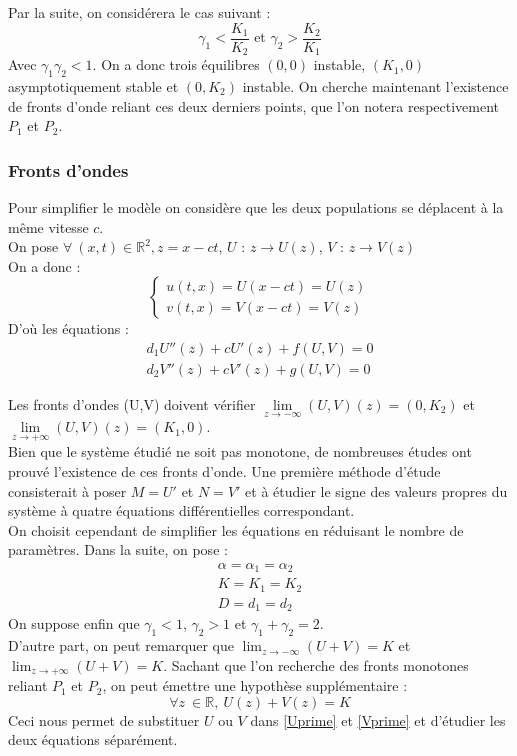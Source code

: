 \documentclass[a4paper,11pt]{article}
\begin{document}
\noindent Par la suite, on considérera le cas suivant : 
\begin{equation}
\gamma_1 < \frac{K_1}{K_2} \mbox{ et } \gamma_2 > \frac{K_2}{K_1}
\end{equation} 
Avec $\gamma_1\gamma_2 < 1$. On a donc trois équilibres $(0,0)$ instable, $(K_1,0)$ asymptotiquement stable et $(0,K_2)$ instable. On cherche maintenant l'existence de fronts d'onde reliant ces deux derniers points, que l'on notera respectivement $P_1$ et $P_2$.

\subsubsection{Fronts d'ondes}

Pour simplifier le modèle on considère que les deux populations se déplacent à la même vitesse $c$.\\
\noindent On pose $\forall\ (x,t) \in \mathbb{R}^2, z = x - ct$, $U$ : $z \rightarrow U(z)$, $V$ : $z \rightarrow V(z)$\\ 
On a donc :
$$\begin{cases}
u(t,x) = U(x-ct) = U(z) \\ v(t,x) = V(x-ct) = V(z)
\end{cases}$$
D'où les équations : 
\begin{eqnarray}
\label{Uprime}d_1 U''(z) + c U'(z) + f(U,V) = 0 \\
\label{Vprime}d_2 V''(z) + c V'(z) + g(U,V) = 0 
\end{eqnarray}

\noindent Les fronts d'ondes (U,V) doivent vérifier $\lim\limits_{z \rightarrow -\infty}(U,V)(z) = (0,K_2)$ et $\lim\limits_{z \rightarrow +\infty}(U,V)(z) = (K_1,0)$.\\

Bien que le système étudié ne soit pas monotone, de nombreuses études ont prouvé l'existence de ces fronts d'onde. Une première méthode d'étude consisterait à poser $M = U'$ et $N = V'$ et à étudier le signe des valeurs propres du système à quatre équations différentielles correspondant.\\

On choisit cependant de simplifier les équations en réduisant le nombre de paramètres. Dans la suite, on pose : \begin{eqnarray}\alpha = \alpha_1 = \alpha_2\\ K = K_1 = K_2\\ D = d_1 = d_2
\end{eqnarray}
On suppose enfin que $\gamma_1 < 1$, $\gamma_2 > 1$ et $\gamma_1 + \gamma_2 = 2$.\\
D'autre part, on peut remarquer que $\lim_{z \to -\infty}(U+V) = K$ et $\lim_{z \to +\infty}(U+V) = K$. Sachant que l'on recherche des fronts monotones reliant $P_1$ et $P_2$, on peut émettre une hypothèse supplémentaire : \begin{equation}\forall z \ \in \mathbb{R},\ U(z) + V(z) = K 
\end{equation}
Ceci nous permet de substituer $U$ ou $V$ dans \eqref{Uprime} et \eqref{Vprime} et d'étudier les deux équations séparément.\\
\end{document}
